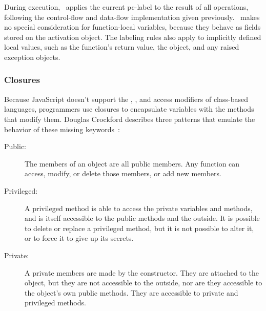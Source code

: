 During execution, \FlowCore\ applies the current pc-label to the result of all operations, following the control-flow and data-flow implementation given previously.
\FlowCore\ makes no special consideration for function-local variables, because they behave as fields stored on the activation object.
The labeling rules also apply to implicitly defined local values, such as the function's return value, the  object, and any raised exception objects.

\begin{comment}
function foo() {
  console.log(arguments.caller)        // undefined
  console.log(arguments.length)        // length of the argumets
  console.log(Function.caller)         // null
  console.log(foo.caller)              // code of parent function
  console.log(arguments.callee.caller) // code of parent function
  console.log(arguments.callee)        // code of self
  console.log(typeof arguments)        // object
}

foo(1,2,3,4)
\end{comment}

\subsubsection{Closures}


Because JavaScript doesn't support the , , and  access modifiers of class-based languages, programmers use closures to encapsulate variables with the methods that modify them.
Douglas Crockford describes three patterns that emulate the behavior of these missing keywords~\cite{crockford+01}:

\begin{description}
  \item[Public:]
    The members of an object are all public members. Any function can access, modify, or delete those members, or add new members.
  \item[Privileged:]
    A privileged method is able to access the private variables and methods, and is itself accessible to the public methods and the outside.
    It is possible to delete or replace a privileged method, but it is not possible to alter it, or to force it to give up its secrets.
  \item[Private:]
    A private members are made by the constructor.
    They are attached to the object, but they are not accessible to the outside, nor are they accessible to the object's own public methods.
    They are accessible to private and privileged methods.
\end{description}

